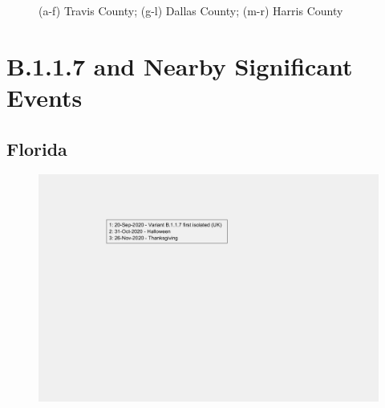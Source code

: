 \documentclass[]{article}
\begin{document}
\begin{figure}
	\caption{(a-f) Travis County; (g-l) Dallas County; (m-r) Harris County}
	\label{fig:foobar}
\end{figure}
\FloatBarrier
\vspace{5mm}



\section{B.1.1.7 and Nearby Significant Events}

\subsection{Florida}

\begin{figure}[!h]
	\includegraphics[width=\linewidth]{legends/B117_legend.png}
	\caption{}
	\label{fig:legends/B117_legendLabel}
\end{figure}
\end{document}
